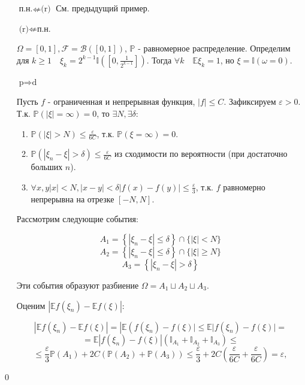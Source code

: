 \documentclass[oneside,final,14pt]{extreport}
\renewenvironment{proof}{{\bfseries Доказательство.}}{\qed}
\theoremstyle{plain}
\theoremstyle{definition}
\theoremstyle{named}
\begin{document}
\begin{proof}
\begin{itemize}
    \item[$\text{п.н.} \nLeftarrow \text{(r)}$] См. предыдущий пример.
    
    \item[$\text{(r)} \nLeftarrow \text{п.н.}$]
    
    $\Omega = [0,1], \mathcal{F} = \mathcal{B}([0,1])$, $\mathbb{P}$ - равномерное распределение. Определим для $k \geqslant 1 \quad \xi_k = 2^{k-1} \mathbb{I}\left(\left[0, \frac{1}{2^{k-1}}\right]\right).$ Тогда $\forall k \quad \mathbb{E}\xi_k = 1$, но $\xi = \mathbb{I}(\omega = 0)$.
    
    \item[$\text{p} \Rightarrow \text{d}$]
    
    Пусть $f$ - ограниченная и непрерывная функция, $|f| \leqslant C$. Зафиксируем $\varepsilon > 0$. Т.к. $\mathbb{P}(|\xi| = \infty) = 0$, то $\exists N, \exists \delta$:
    
    \begin{enumerate}
        \item $\mathbb{P}(|\xi| > N) \leqslant \frac{\varepsilon}{6C}$, т.к. $\mathbb{P}(\xi = \infty) = 0$.
        \item $\mathbb{P}(|\xi_n - \xi| > \delta) \leqslant \frac{\varepsilon}{6C}$ из сходимости по вероятности (при достаточно больших $n$).
        \item $\forall x,y |x| < N, |x - y| < \delta|f(x) - f(y)| \leqslant \frac{\varepsilon}{3}$, т.к. $f$ равномерно непрерывна на отрезке $[-N, N]$.
    \end{enumerate}
    
    Рассмотрим следующие события:
    
    $$ A_{1}=\left\{\left|\xi_{n}-\xi\right| \leqslant \delta\right\} \cap\{|\xi|<N\} $$
    $$ A_{2}=\left\{\left|\xi_{n}-\xi\right| \leqslant \delta\right\} \cap\{|\xi| \geqslant N\} $$
    $$ A_{3}=\left\{\left|\xi_{n}-\xi\right|>\delta\right\} $$
    
    Эти события образуют разбиение $\Omega=A_{1} \sqcup A_{2} \sqcup A_{3} $. 
    
    Оценим $|\mathbb{E}f(\xi_n) - \mathbb{E}f(\xi)|$:
    
    $$\left|\mathbb{E} f\left(\xi_{n}\right)-\mathbb{E} f(\xi)\right|=\left|\mathbb{E}\left(f\left(\xi_{n}\right)-f(\xi)|\leqslant \mathbb{E}| f\left(\xi_{n}\right)-f(\xi) |=\right.\right.$$
    $$=\mathbb{E}\left|f\left(\xi_{n}\right)-f(\xi)\right|\left(\mathbb{I}_{A_{1}}+\mathbb{I}_{A_{2}}+\mathbb{I}_{A_{3}}\right) \leq$$
    $$\leqslant \frac{\varepsilon}{3} \mathbb{P}\left(A_{1}\right)+2 C\left(\mathbb{P}\left(A_{2}\right)+\mathbb{P}\left(A_{3}\right)\right) \leqslant \frac{\varepsilon}{3}+2 C\left(\frac{\varepsilon}{6 C}+\frac{\varepsilon}{6 C}\right)=\varepsilon,$$
    

\end{itemize}
\end{proof}
\end{document}
